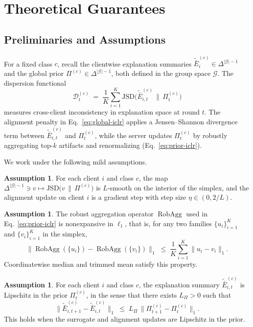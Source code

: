 \documentclass{article}
\theoremstyle{plain}
\theoremstyle{definition}
\newtheorem{assumption}[theorem]{Assumption}
\theoremstyle{remark}
\begin{document}
\section{Theoretical Guarantees}
\label{app:theory}

\subsection{Preliminaries and Assumptions}

For a fixed class $c$, recall the clientwise explanation summaries
$\tilde{\bar{E}}^{(c)}_i \in \Delta^{|\mathcal{G}|-1}$ and the global prior
$\Pi^{(c)} \in \Delta^{|\mathcal{G}|-1}$, both defined in the group space
$\mathcal{G}$. The dispersion functional
\begin{equation}
\label{eq:disp-functional-theory}
\mathcal{D}^{(c)}_t \;=\; \frac{1}{K}\sum_{i=1}^{K}
\mathrm{JSD}\!\Big(\tilde{\bar{E}}^{(c)}_{i,t} \,\big\|\, \Pi^{(c)}_t\Big)
\end{equation}
measures cross-client inconsistency in explanation space at round $t$.
The alignment penalty in Eq.~\eqref{eq:global-iclr} applies a
Jensen--Shannon divergence term between $\tilde{\bar{E}}^{(c)}_{i,t}$ and
$\Pi^{(c)}_t$, while the server updates $\Pi^{(c)}_t$ by robustly aggregating
top-$k$ artifacts and renormalizing (Eq.~\eqref{eq:prior-iclr}).

We work under the following mild assumptions.

\begin{assumption}
\label{ass:smooth-jsg}
For each client $i$ and class $c$, the map
$\Delta^{|\mathcal{G}|-1} \ni v \mapsto \mathrm{JSD}\big(v\,\|\,\Pi^{(c)}\big)$
is $L$-smooth on the interior of the simplex, and the alignment update on
client $i$ is a gradient step with step size $\eta \in (0,2/L)$.
\end{assumption}

\begin{assumption}
\label{ass:robagg-nonexp}
The robust aggregation operator $\operatorname{RobAgg}$ used in
Eq.~\eqref{eq:prior-iclr} is nonexpansive in $\ell_1$, that is, for any two
families $\{u_i\}_{i=1}^K$ and $\{v_i\}_{i=1}^K$ in the simplex,
\[
\big\|\operatorname{RobAgg}(\{u_i\}) - \operatorname{RobAgg}(\{v_i\})\big\|_1
\;\le\; \frac{1}{K}\sum_{i=1}^K \|u_i - v_i\|_1.
\]
Coordinatewise median and trimmed mean satisfy this property.
\end{assumption}

\begin{assumption}
\label{ass:lipschitz-sur}
For each client $i$ and class $c$, the explanation summary
$\tilde{\bar{E}}^{(c)}_{i,t}$ is Lipschitz in the prior $\Pi^{(c)}_t$, in the
sense that there exists $L_{\Pi} > 0$ such that
\[
\big\|\tilde{\bar{E}}^{(c)}_{i,t+1} - \tilde{\bar{E}}^{(c)}_{i,t}\big\|_1
\;\le\; L_{\Pi}\,\big\|\Pi^{(c)}_{t+1} - \Pi^{(c)}_{t}\big\|_1.
\]
This holds when the surrogate and alignment updates are Lipschitz in the prior.
\end{assumption}
\end{document}
